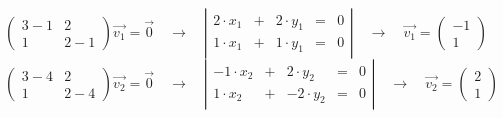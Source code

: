 $\left( \begin{array}{cc}
	3-1 & 2\\
	1 & 2-1
\end{array} \right) \vec{v_1} = \vec{0}
\quad \rightarrow \quad
\left| \begin{array}{ccccc}
2 \cdot x_1 & + & 2 \cdot y_1 & = & 0 \\
1 \cdot x_1 & + & 1 \cdot y_1 & = & 0
\end{array} \right|
\quad \rightarrow \quad
\vec{v_1} = \left(\begin{array}{c}
	-1\\
	1
\end{array}\right)$\\[5pt]

$\left( \begin{array}{cc}
3-4 & 2\\
1 & 2-4
\end{array} \right) \vec{v_2} = \vec{0}
\quad \rightarrow \quad
\left| \begin{array}{ccccc}
-1 \cdot x_2 & + & 2 \cdot y_2 & = & 0 \\
1 \cdot x_2 & + & -2 \cdot y_2 & = & 0
\end{array} \right|
\quad \rightarrow \quad
\vec{v_2} = \left(\begin{array}{c}
2\\
1
\end{array}\right)$\\





